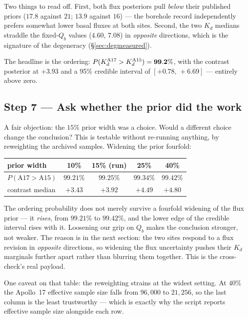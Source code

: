 \documentclass[11pt]{report}
\begin{document}
\noindent Two things to read off. First, both flux posteriors pull
\emph{below} their published priors ($17.8$ against $21$; $13.9$ against
$16$) --- the borehole record independently prefers somewhat lower basal
fluxes at both sites. Second, the two $K_d$ medians straddle the fixed-$Q_b$
values ($4.60$, $7.08$) in \emph{opposite} directions, which is the
signature of the degeneracy (\S\ref{sec:degmeasured}).

The headline is the ordering: $P(K_d^{\rm A17}>K_d^{\rm A15}) =
\mathbf{99.2\%}$, with the contrast posterior at $+3.93$ and a 95\% credible
interval of $[+0.78,\,+6.69]$ --- entirely above zero.

\subsection*{Step 7 --- Ask whether the prior did the work}
A fair objection: the $15\%$ prior width was a choice. Would a different
choice change the conclusion? This is testable without re-running anything,
by reweighting the archived samples. Widening the prior fourfold:

\begin{center}\small
\begin{tabular}{@{}lcccc@{}}
\toprule
prior width & 10\% & 15\% (run) & 25\% & 40\% \\
\midrule
$P(\mathrm{A17}>\mathrm{A15})$ & $99.21\%$ & $99.25\%$ & $99.34\%$ & $99.42\%$ \\
contrast median & $+3.43$ & $+3.92$ & $+4.49$ & $+4.80$ \\
\bottomrule
\end{tabular}
\end{center}

\begin{keypt}
The ordering probability does not merely survive a fourfold widening of the
flux prior --- it \emph{rises}, from $99.21\%$ to $99.42\%$, and the lower
edge of the credible interval rises with it. Loosening our grip on $Q_b$
makes the conclusion stronger, not weaker. The reason is in the next section:
the two sites respond to a flux revision in \emph{opposite} directions, so
widening the flux uncertainty pushes their $K_d$ marginals further apart
rather than blurring them together. This is the cross-check's real payload.
\end{keypt}

\noindent One caveat on that table: the reweighting strains at the widest
setting. At $40\%$ the Apollo~17 effective sample size falls from $96{,}000$
to $21{,}256$, so the last column is the least trustworthy --- which is
exactly why the script reports effective sample size alongside each row.
\end{document}
